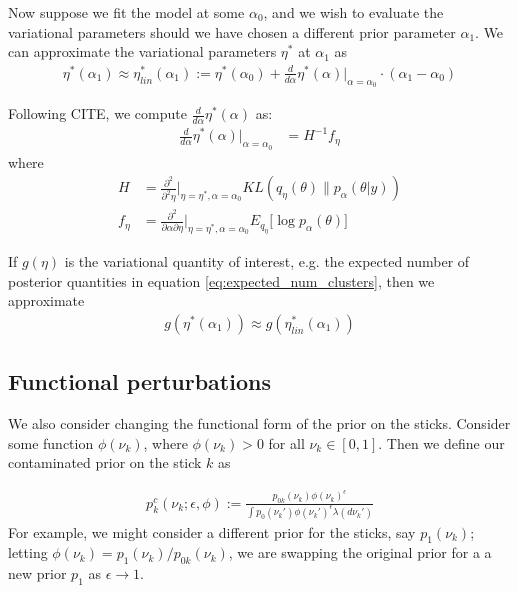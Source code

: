 \documentclass[a4paper]{article}
\begin{document}
Now suppose we fit the model at some $\alpha_0$, and we wish to evaluate the
variational parameters should we have chosen a different prior parameter $\alpha_1$.
We can approximate the variational parameters $\eta^*$ at $\alpha_1$ as
\begin{align}
    \eta^*(\alpha_1) \approx \eta^*_{lin}(\alpha_1)
    := \eta^*(\alpha_0) + \frac{d}{d\alpha}\eta^*(\alpha)\Big|_{\alpha=\alpha_0} \cdot (\alpha_1 - \alpha_0)
    \label{eq:our_approximation}
\end{align}

Following CITE,  we compute $\frac{d}{d\alpha}\eta^*(\alpha) $ as:
\begin{align}
  \frac{d}{d\alpha}\eta^*(\alpha)\Big|_{\alpha=\alpha_0} &= H^{-1} f_\eta \label{eq:vb_sensitivty}
\end{align}
where
\begin{align}
  H &= \frac{\partial^2}{\partial^2\eta}\Big\rvert_{\eta = \eta^*, \alpha = \alpha_0}
  KL(q_\eta\left(\theta\right) \| p_\alpha(\theta | y)) \\
  f_\eta &= \frac{\partial^2}{\partial \alpha \partial \eta}\Big\rvert_{\eta = \eta^*, \alpha = \alpha_0} E_{q_{\eta}} \big[\log p_\alpha(\theta)\big]
\end{align}

If $g(\eta)$ is the variational quantity of interest,
e.g. the expected number of posterior quantities in equation \ref{eq:expected_num_clusters},
then we approximate
\begin{align}
    g(\eta^*(\alpha_1)) \approx g(\eta^*_{lin}(\alpha_1))
\end{align}

\subsection{Functional perturbations}
\label{sec:func_pert}
We also consider changing the functional form of the prior on the sticks.
Consider some function $\phi(\nu_k)$, where $\phi(\nu_k) > 0$ for all $\nu_k \in [0, 1]$.
Then we define our contaminated prior on the stick $k$ as

\begin{align}
	\label{eq:expon_perturb}
	p^c_{k}(\nu_k ; \epsilon, \phi) :=
  \frac{p_{0k}(\nu_k)\phi(\nu_k)^\epsilon}{\int p_0(\nu_k')\phi(\nu_k')^\epsilon \lambda(d\nu_k')}
\end{align}
For example, we might consider a different prior for the sticks, say $p_1(\nu_k)$;
letting $\phi(\nu_k) = p_1(\nu_k) / p_{0k}(\nu_k)$,
we are swapping the original prior for a a new prior $p_1$ as $\epsilon \rightarrow 1$.
\end{document}
